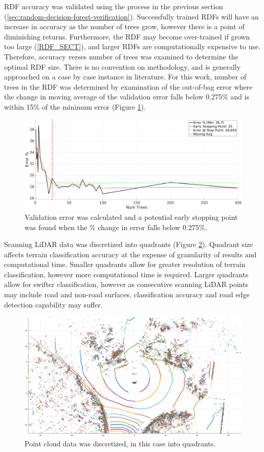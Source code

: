 \documentclass[numbered,pdftex]{ohio-etd}
\begin{document}
{{{{				{RDF accuracy was validated using the process in the previous section (\ref{sec:random-decision-forest-verification}). Successfully trained RDFs will have an increase in accuracy as the number of trees grow, however there is a point of diminishing returns. Furthermore, the RDF may become over-trained if grown too large (\ref{RDF_SECT}), and larger RDFs are computationally expensive to use. Therefore, accuracy verses number of trees was examined to determine the optimal RDF size. There is no convention on methodology, and is generally approached on a case by case instance in literature. For this work, number of trees in the RDF was determined by examination of the out-of-bag error where the change in moving average of the validation error falls below 0.275\% and is within 15\% of the minimum error (Figure \ref{fig:Overall_Error_Early_Stopping}).}
				
				\begin{figure}[H]
					\centering
					\includegraphics[width=0.75\linewidth]{Defense_Images/Overall_Error_Early_Stopping}
					\caption[Validation Error versus RDF Size]{Validation error was calculated and a potential early stopping point was found when the \% change in error falls below 0.275\%.}
					\label{fig:Overall_Error_Early_Stopping}
				\end{figure}
				
				{Scanning LiDAR data was discretized into quadrants (Figure \ref{fig:channel_split_multi}). Quadrant size affects terrain classification accuracy at the expense of granularity of results and computational time. Smaller quadrants allow for greater resolution of terrain classification, however more computational time is required. Larger quadrants allow for swifter classification, however as consecutive scanning LiDAR points may include road and non-road surfaces, classification accuracy and road edge detection capability may suffer.}
				
				\begin{figure}[H]
					\centering
					\includegraphics[width=0.7\linewidth]{Defense_Images/channel_split_multi}
					\caption[Quadrants Discretization]{Point cloud data was discretized, in this case into quadrants. }
					\label{fig:channel_split_multi}
				\end{figure}
				
}}}}
\end{document}
